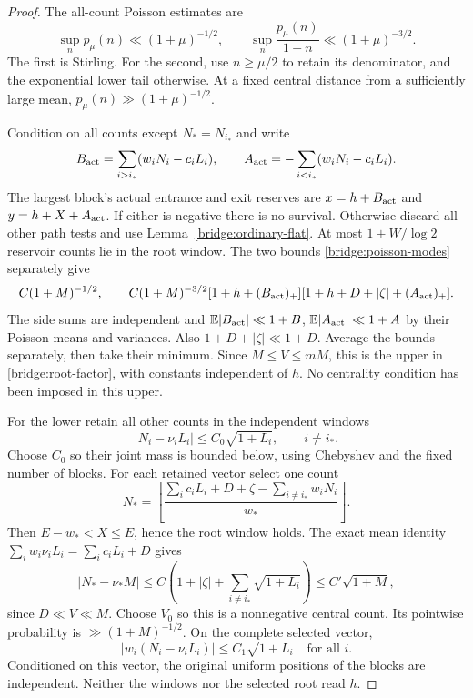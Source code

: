\begin{proof}
The all-count Poisson estimates are
\begin{equation}
 \sup_np_\mu(n)\ll(1+\mu)^{-1/2},\qquad
 \sup_n\frac{p_\mu(n)}{1+n}\ll(1+\mu)^{-3/2}.
 \label{bridge:poisson-modes}
\end{equation}
The first is Stirling. For the second, use $n\ge\mu/2$ to retain
its denominator, and the exponential lower tail otherwise. At a
fixed central distance from a sufficiently large mean,
$p_\mu(n)\gg(1+\mu)^{-1/2}$.

Condition on all counts except $N_*=N_{i_*}$ and write
\[
 B_{\rm act}=\sum_{i>i_*}(w_iN_i-c_iL_i),\qquad
 A_{\rm act}=-\sum_{i<i_*}(w_iN_i-c_iL_i).
\]
The largest block's actual entrance and exit reserves are
$x=h+B_{\rm act}$ and $y=h+X+A_{\rm act}$. If either is negative
there is no survival. Otherwise discard all other path tests and
use Lemma~\ref{bridge:ordinary-flat}. At most $1+W/\log2$ reservoir
counts lie in the root window. The two bounds
\eqref{bridge:poisson-modes} separately give
\[
 C(1+M)^{-1/2},\qquad
 C(1+M)^{-3/2}
 [1+h+(B_{\rm act})_+]
 [1+h+D+|\zeta|+(A_{\rm act})_+].
\]
The side sums are independent and
$\mathbb E|B_{\rm act}|\ll1+B$,
$\mathbb E|A_{\rm act}|\ll1+A$ by their Poisson means and
variances. Also $1+D+|\zeta|\ll1+D$. Average the bounds separately,
then take their minimum. Since $M\le V\le mM$, this is the upper
in \eqref{bridge:root-factor}, with constants independent of $h$.
No centrality condition has been imposed in this upper.

For the lower retain all other counts in the independent windows
\begin{equation}
 |N_i-\nu_iL_i|\le C_0\sqrt{1+L_i},\qquad i\ne i_*.
 \label{bridge:root-count-box}
\end{equation}
Choose $C_0$ so their joint mass is bounded below, using Chebyshev
and the fixed number of blocks. For each retained vector select one
count
\begin{equation}
 N_*=\left\lfloor
 \frac{\sum_ic_iL_i+D+\zeta-\sum_{i\ne i_*}w_iN_i}{w_*}
 \right\rfloor.
 \label{bridge:root-selection}
\end{equation}
Then $E-w_*<X\le E$, hence the root window holds. The exact mean
identity $\sum_iw_i\nu_iL_i=\sum_ic_iL_i+D$ gives
\[
 |N_*-\nu_*M|
 \le C\left(1+|\zeta|+\sum_{i\ne i_*}\sqrt{1+L_i}\right)
 \le C'\sqrt{1+M},
\]
since $D\ll V\ll M$. Choose $V_0$ so this is a nonnegative central
count. Its pointwise probability is $\gg(1+M)^{-1/2}$.
On the complete selected vector,
\begin{equation}
 |w_i(N_i-\nu_iL_i)|\le C_1\sqrt{1+L_i}\quad\text{for all }i.
 \label{bridge:root-complete-box}
\end{equation}
Conditioned on this vector, the original uniform positions of the
blocks are independent. Neither the windows nor the selected root
read $h$.


\end{proof}
